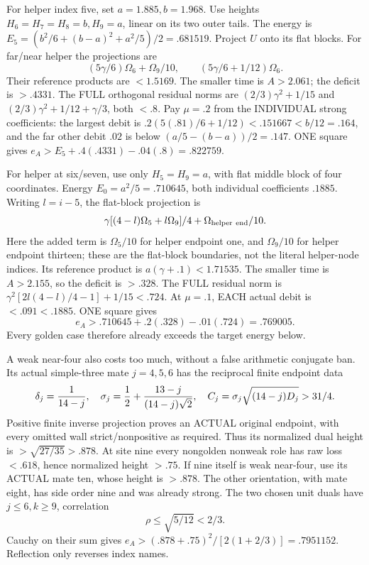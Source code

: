 \documentclass[11pt]{article}
\begin{document}
For helper index five, set \(a=1.885,b=1.968\).
Use heights \(H_6=H_7=H_8=b,H_9=a\), linear
on its two outer tails.
The energy is
\(E_5=(b^2/6+(b-a)^2+a^2/5)/2=.681519\).
Project \(U\) onto its flat blocks.
For far/near helper the projections are
\[
 (5\gamma/6)\Omega_6+\Omega_9/10,\qquad
 (5\gamma/6+1/12)\Omega_6 .
\]
Their reference products are \(<1.5169\).
The smaller time is \(A>2.061\); the deficit
is \(>.4331\).
The FULL orthogonal residual norms are
\((2/3)\gamma^2+1/15\) and
\((2/3)\gamma^2+1/12+\gamma/3\), both \(<.8\).
Pay \(\mu=.2\) from the INDIVIDUAL strong
coefficients: the largest debit is
\(.2(5(.81)/6+1/12)<.151667<b/12=.164\),
and the far other debit \(.02\) is below
\((a/5-(b-a))/2=.147\).
ONE square gives
\(e_A>E_5+.4(.4331)-.04(.8)=.822759\).

For helper at six/seven, use only
\(H_5=H_9=a\), with flat middle block of four
coordinates.
Energy \(E_0=a^2/5=.710645\), both individual
coefficients \(.1885\).
Writing \(l=i-5\), the flat-block projection is
\[
 \gamma[(4-l)\Omega_5+l\Omega_9]/4
                         +\Omega_{\rm helper\ end}/10 .
\]
Here the added term is \(\Omega_5/10\) for helper endpoint one,
and \(\Omega_9/10\) for helper endpoint thirteen; these are the
flat-block boundaries, not the literal helper-node indices.
Its reference product is
\(a(\gamma+.1)<1.71535\).
The smaller time is \(A>2.155\), so the
deficit is \(>.328\).
The FULL residual norm is
\(\gamma^2[2l(4-l)/4-1]+1/15<.724\).
At \(\mu=.1\), EACH actual debit is
\(<.091<.1885\).
ONE square gives
\[
                           e_A>.710645+.2(.328)-.01(.724)
                                      =.769005 .
\]
Every golden case therefore already exceeds
the target energy below.

A weak near-four also costs too much, without
a false arithmetic conjugate ban.
Its actual simple-three mate \(j=4,5,6\) has
the reciprocal finite endpoint data
\[
 \delta_j={1\over14-j},\quad
 \sigma_j={1\over2}+{13-j\over(14-j)\sqrt2},\quad
 C_j=\sigma_j\sqrt{(14-j)D_j}>31/4 .
\]
Positive finite inverse projection proves an
ACTUAL original endpoint, with every omitted
wall strict/nonpositive as required.
Thus its normalized dual height is
\(>\sqrt{27/35}>.878\).
At site nine every nongolden nonweak role has
raw loss \(<.618\), hence normalized height
\(>.75\).
If nine itself is weak near-four, use its
ACTUAL mate ten, whose height is \(>.878\).
The other orientation, with mate eight, has
side order nine and was already strong.
The two chosen unit duals have \(j\le6,k\ge9\),
correlation
\[
                         \rho\le\sqrt{5/12}<2/3 .
\]
Cauchy on their sum gives
\(e_A>(.878+.75)^2/[2(1+2/3)]=.7951152\).
Reflection only reverses index names.
\end{document}
